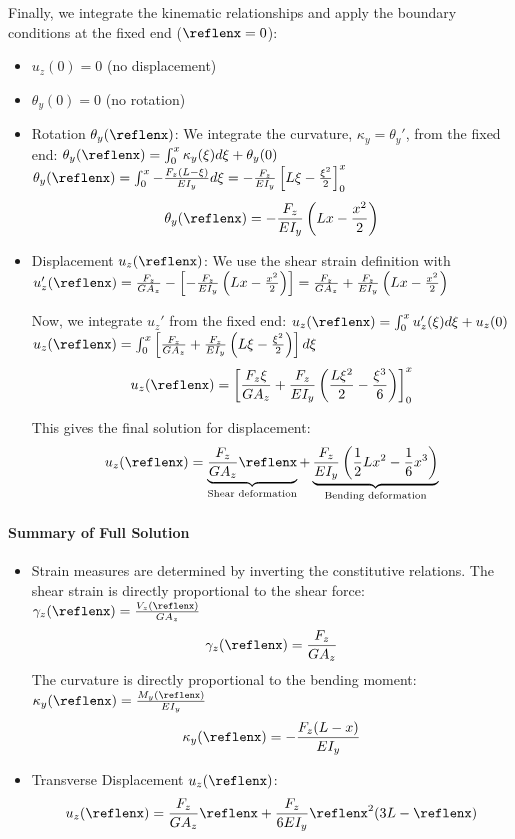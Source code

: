 Finally, we integrate the kinematic relationships and apply the boundary conditions at the fixed end (\(\reflenx=0\)):
\begin{itemize}
\item $u_z(0) = 0$ (no displacement)
\item $\theta_y(0) = 0$ (no rotation)
\end{itemize}
\begin{itemize}
\item 
Rotation $\theta_y(\reflenx)$:
    We integrate the curvature, $\kappa_y = \theta_y'$, from the fixed end:
    $\theta_y(\reflenx) = \int_{0}^{x} \kappa_y(\xi) d\xi + \theta_y(0)$
    $\theta_y(\reflenx) = \int_{0}^{x} -\frac{F_z(L-\xi)}{E I_y} d\xi = -\frac{F_z}{E I_y} \left[ L\xi - \frac{\xi^2}{2} \right]_{0}^{x}$
    $$\theta_y(\reflenx) = -\frac{F_z}{E I_y} \left( Lx - \frac{x^2}{2} \right)$$
\item
Displacement $u_z(\reflenx)$:
    We use the shear strain definition with
    $u_z'(\reflenx) = \frac{F_z}{G A_z} - \left[ -\frac{F_z}{E I_y} \left( Lx - \frac{x^2}{2} \right) \right] = \frac{F_z}{G A_z} + \frac{F_z}{E I_y} \left( Lx - \frac{x^2}{2} \right)$
    
    Now, we integrate $u_z'$ from the fixed end:
    $u_z(\reflenx) = \int_{0}^{x} u_z'(\xi) d\xi + u_z(0)$
    $u_z(\reflenx) = \int_{0}^{x} \left[ \frac{F_z}{G A_z} + \frac{F_z}{E I_y} \left( L\xi - \frac{\xi^2}{2} \right) \right] d\xi$
    $$
    u_z(\reflenx) = \left[ \frac{F_z \xi}{G A_z} + \frac{F_z}{E I_y} \left( \frac{L\xi^2}{2} - \frac{\xi^3}{6} \right) \right]_{0}^{x}
    $$
    
    This gives the final solution for displacement:
    $$
    u_z(\reflenx) 
    = \underbrace{\frac{F_z}{G A_z}\reflenx}_{\text{Shear deformation}}
    + \underbrace{\frac{F_z}{E I_y} \left( \frac{1}{2}L x^2 - \frac{1}{6} x^3 \right)}_{\text{Bending deformation}}
    $$
\end{itemize}

\paragraph{Summary of Full Solution}

\begin{itemize}
\item Strain measures are determined by inverting the constitutive relations. 
    The shear strain is directly proportional to the shear force:
    $\gamma_z(\reflenx) = \frac{V_z(\reflenx)}{G A_z}$
    $$\gamma_z(\reflenx) = \frac{F_z}{G A_z}$$
    The curvature is directly proportional to the bending moment:
    $\kappa_y(\reflenx) = \frac{M_y(\reflenx)}{E I_y}$
    $$\kappa_y(\reflenx) = -\frac{F_z(L-x)}{E I_y}$$
\item
Transverse Displacement $u_z(\reflenx)$:
    $$
    u_z(\reflenx) = \frac{F_z}{G A_z}\reflenx + \frac{F_z}{6 E I_y}\reflenx^2(3L-\reflenx)
    $$
\end{itemize}
